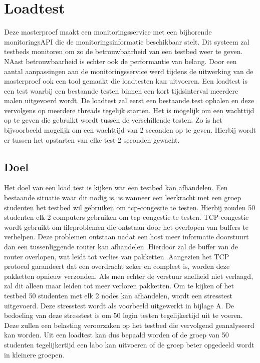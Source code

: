 \chapter{Loadtest}
{\samenvatting Deze masterproef maakt een monitoringsservice met een bijhorende monitoringsAPI die de monitoringsinformatie beschikbaar stelt. Dit systeem zal testbeds monitoren om zo de betrouwbaarheid van een testbed weer te geven. NAast betrouwbaarheid is echter ook de performantie van belang. Door een aantal aanpassingen aan de monitoringsservice werd tijdens de uitwerking van de masterproef ook een tool gemaakt die loadtesten kan uitvoeren. Een loadtest is een test waarbij een bestaande testen binnen een kort tijdsinterval meerdere malen uitgevoerd wordt. De loadtest zal eerst een bestaande test ophalen en deze vervolgens op meerdere threads tegelijk starten. Het is mogelijk om een wachttijd op te geven die gebruikt wordt tussen de verschillende testen. Zo is het bijvoorbeeld mogelijk om een wachttijd van 2 seconden op te geven. Hierbij wordt er tussen het opstarten van elke test 2 seconden gewacht.}
\section{Doel}
\npar
Het doel van een load test is kijken wat een testbed kan afhandelen. Een bestaande situatie waar dit nodig is, is wanneer een leerkracht met een groep studenten het testbed wil gebruiken om tcp-congestie te testen. Hierbij zouden 50 studenten elk 2 computers gebruiken om tcp-congestie te testen. TCP-congestie wordt gebruikt om fileproblemen die ontstaan door het overlopen van buffers te verhelpen. Deze problemen ontstaan nadat een host meer informatie doorstuurt dan een tussenliggende router kan afhandelen. Hierdoor zal de buffer van de router overlopen, wat leidt tot verlies van pakketten. Aangezien het TCP protocol garandeert dat een overdracht zeker en compleet is, worden deze pakketten opnieuw verzonden. Als men echter de verstuur snelheid niet verlaagd, zal dit alleen maar leiden tot meer verloren pakketten.
\clearpage
\npar
Om te kijken of het testbed 50 studenten met elk 2 nodes kan afhandelen, wordt een stresstest uitgevoerd. Deze stresstest wordt als voorbeeld uitgewerkt in bijlage A. De bedoeling van deze stresstest is om 50 login testen tegelijkertijd uit te voeren. Deze zullen een belasting veroorzaken op het testbed die vervolgend geanalyseerd kan worden. Uit een loadtest kan dus bepaald worden of de groep van 50 studenten tegelijkertijd een labo kan uitvoeren of de groep beter opgedeeld wordt in kleinere groepen.
